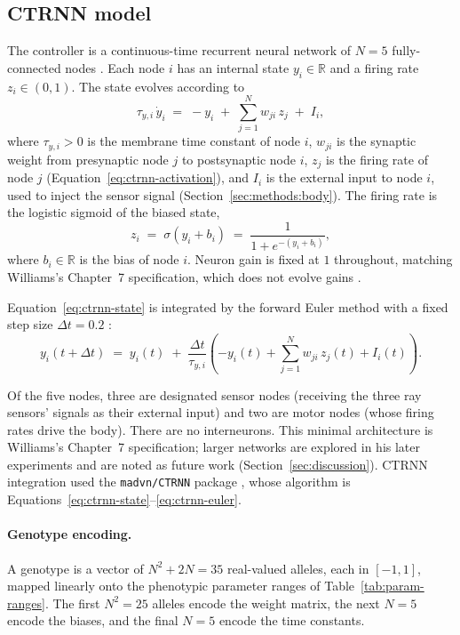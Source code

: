 \subsection{CTRNN model}
\label{sec:methods:ctrnn}

The controller is a continuous-time recurrent neural network of $N = 5$
fully-connected nodes \parencite{beer1995}. Each node $i$ has an internal state
$y_i \in \mathbb{R}$ and a firing rate $z_i \in (0, 1)$. The state evolves
according to
%
\begin{equation}
  \tau_{y,i}\, \dot{y}_i \;=\; -y_i \;+\; \sum_{j=1}^{N} w_{ji}\, z_j \;+\; I_i,
  \label{eq:ctrnn-state}
\end{equation}
%
where $\tau_{y,i} > 0$ is the membrane time constant of node $i$, $w_{ji}$ is
the synaptic weight from presynaptic node $j$ to postsynaptic node $i$, $z_j$ is
the firing rate of node $j$ (Equation~\ref{eq:ctrnn-activation}), and $I_i$ is
the external input to node $i$, used to inject the sensor signal
(Section~\ref{sec:methods:body}). The firing rate is the logistic sigmoid of the
biased state,
%
\begin{equation}
  z_i \;=\; \sigma(y_i + b_i) \;=\; \frac{1}{1 + e^{-(y_i + b_i)}},
  \label{eq:ctrnn-activation}
\end{equation}
%
where $b_i \in \mathbb{R}$ is the bias of node $i$. Neuron gain is fixed at $1$
throughout, matching Williams's Chapter~7 specification, which does not evolve
gains \parencite{williams2006}.

Equation~\ref{eq:ctrnn-state} is integrated by the forward Euler method with a
fixed step size $\Delta t = 0.2$ \parencite{williams2006}:
%
\begin{equation}
  y_i(t + \Delta t) \;=\; y_i(t)
  \;+\; \frac{\Delta t}{\tau_{y,i}}
  \left( -y_i(t) + \sum_{j=1}^{N} w_{ji}\, z_j(t) + I_i(t) \right).
  \label{eq:ctrnn-euler}
\end{equation}

Of the five nodes, three are designated sensor nodes (receiving the three ray
sensors' signals as their external input) and two are motor nodes (whose firing
rates drive the body). There are no interneurons. This minimal architecture is
Williams's Chapter~7 specification; larger networks are explored in his later
experiments and are noted as future work (Section~\ref{sec:discussion}).
CTRNN integration used the \texttt{madvn/CTRNN} package \parencite{candadai2020},
whose algorithm is Equations~\ref{eq:ctrnn-state}--\ref{eq:ctrnn-euler}.

\paragraph{Genotype encoding.}
A genotype is a vector of $N^2 + 2N = 35$ real-valued alleles, each in
$[-1, 1]$, mapped linearly onto the phenotypic parameter ranges of
Table~\ref{tab:param-ranges}. The first $N^2 = 25$ alleles encode the weight
matrix, the next $N = 5$ encode the biases, and the final $N = 5$ encode the
time constants.

